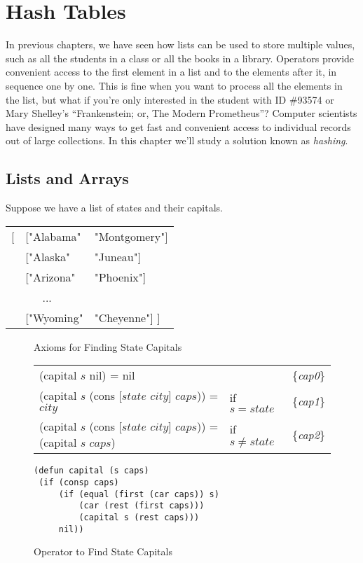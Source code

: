 \chapter{Hash Tables}
\label{ch:hash-tables}

In previous chapters, we have seen how lists can be used to store
multiple values, such as all the students in a class or all the books
in a library. Operators provide convenient access to the first element
in a list and to the elements after it, in sequence one by one.
This is fine when you want to
process all the elements in the list, but what if you're only interested
in the student with ID \#93574 or Mary Shelley's ``Frankenstein; or,
The Modern Prometheus''?
Computer scientists have designed many
ways to get fast and convenient access
to individual records out of large collections.
In this chapter we'll study a solution known as \emph{hashing}.

\section{Lists and Arrays}

Suppose we have a list of states and their
\label{states-capitals-list}capitals.
\begin{center}
\begin{tabular}{lll}
\textsf{[} &\textsf{["Alabama"}  &\textsf{"Montgomery"]}\\
  &\textsf{["Alaska"}   &\textsf{"Juneau"]}\\
  &\textsf{["Arizona"}  &\textsf{"Phoenix"]}\\
  &~~~...      &\\
  &\textsf{["Wyoming"}  &\textsf{"Cheyenne"] ]}\\
\end{tabular}
\end{center}

\begin{figure}
\begin{center}
Axioms for Finding State Capitals
\begin{tabular}{lll}
(capital $s$ nil) = nil                               &             & \{\emph{cap0}\} \\
(capital $s$ (cons [$state$ $city$] $caps$)) = $city$ &if $s=state$ & \{\emph{cap1}\} \\
(capital $s$ (cons [$state$ $city$] $caps$)) = (capital $s$ $caps$) & if $s \neq state$ & \{\emph{cap2}\} \\
\end{tabular}
\begin{Verbatim}
(defun capital (s caps)
 (if (consp caps)
     (if (equal (first (car caps)) s)
         (car (rest (first caps)))
         (capital s (rest caps)))
     nil))
\end{Verbatim}
\caption{Operator to Find State Capitals}
\label{fig:state-capital-operator}
\end{center}
\end{figure}

